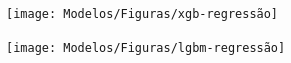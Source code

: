 \begin{figure}[H]
	\centering
	\caption{Resultados da regressão utilizando XGBoost e LightGBM \label{fig:xgb}\label{fig:lgb}}
	\label{fig:1-xgb-regressao}
	
	\begin{subfigure}{1\textwidth}
			\texttt{[image: Modelos/Figuras/xgb-regressão]}
			
		\end{subfigure}\hfill
	\begin{subfigure}{1\textwidth}
			\texttt{[image: Modelos/Figuras/lgbm-regressão]}
			
		\end{subfigure}
	


\end{figure}	




% 
%	
%	
%





	
	
	
	
	
	




